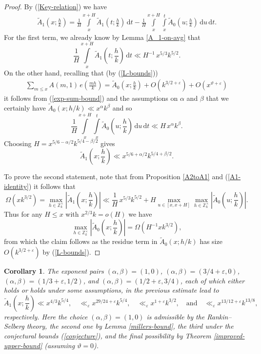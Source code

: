 \documentclass[a4paper,10pt,twoside]{amsart}
\newtheorem{corollary}[theorem]{Corollary}
\theoremstyle{definition}
\numberwithin{equation}{section}
\newcommand\eps{\varepsilon}
\renewcommand\:{\colon}
\begin{document}
\begin{proof}
By (\ref{Key-relation}) we have
\begin{align}\label{A1-identity}
\widetilde A_1\left(x;\frac hk\right)=\frac1H\int\limits_x^{x+H}\widetilde A_1\left(t;\frac hk\right)\,\mathrm dt
-\frac1H\int\limits_x^{x+H}\int\limits_x^t \widetilde A_0\left(u;\frac hk\right)\,\mathrm du\,\mathrm dt.
\end{align}
For the first term, we already know by Lemma \ref{A_1-on-avg} that
\[\frac1H\int\limits_x^{x+H}\widetilde A_1\left(t;\frac hk\right)\,\mathrm dt\ll H^{-1}\,x^{5/3}k^{5/2}.\]
On the other hand, recalling that (by (\ref{L-bounds}))
\begin{align}\label{Connecting_A_0_to_A}
\sum_{m\leqslant x}A(m,1)\,e\!\left(\frac{mh}k\right)=\widetilde A_0\!\left(x;\frac hk\right)+O(k^{3/2+\varepsilon})+O(x^{\vartheta+\varepsilon})
\end{align}
it follows from (\ref{exp-sum-bound}) and the assumptions on $\alpha$ and $\beta$ that we certainly have $\widetilde A_0(x;h/k)\ll x^\alpha k^\beta$ and so
\[\frac1H\int\limits_x^{x+H}\int\limits_x^t\widetilde A_0\left(u;\frac hk\right)\,\mathrm du\,\mathrm dt\ll H\,x^\alpha k^\beta.\]
Choosing $H=x^{5/6-\alpha/2}k^{5/4-\beta/2}$ gives
\[\widetilde A_1\left(x;\frac hk\right)\ll x^{5/6+\alpha/2}k^{5/4+\beta/2}.\]

\noindent To prove the second statement, note that from Proposition \ref{A2toA1} and (\ref{A1-identity}) it follows that
\[\Omega\left(xk^{3/2}\right)=\max_{h\in\mathbb Z_k^\times}\left|\widetilde A_1\left(x;\frac hk\right)\right|\ll \frac1H\,x^{5/3}k^{5/2}+H\max_{u\in[x,x+H]}\max_{h\in\mathbb Z_k^\times}\left|\widetilde A_0\left(u;\frac hk\right)\right|.\]
Thus for any $H\leq x$ with $x^{2/3}k=o(H)$ we have 
\[
\max_{h\in\mathbb Z_k^\times}\left|\widetilde A_0\left(x;\frac hk\right)\right|=\Omega\left(H^{-1}xk^{3/2}\right),\]
from which the claim follows as the residue term in $\widetilde A_0(x;h/k)$ has size $O(k^{3/2+\eps})$ by (\ref{L-bounds}).
\end{proof}

\begin{corollary}
The exponent pairs $(\alpha,\beta)=(1,0)$, $(\alpha,\beta)=(3/4+\varepsilon,0)$, $(\alpha,\beta)=(1/3+\varepsilon,1/2)$, and $(\alpha,\beta)=(1/2+\varepsilon,3/4)$, each of which either holds or holds under some assumptions, in the previous estimate lead to 
\[\widetilde A_1\left(x;\frac hk\right)\ll x^{4/3}k^{5/4},\quad
\ll_\eps x^{29/24+\varepsilon}k^{5/4},\quad
\ll_\eps x^{1+\varepsilon}k^{3/2},\quad\text{and}\quad
\ll_\eps x^{13/12+\varepsilon}k^{13/8},\]
respectively. Here the choice $(\alpha,\beta)=(1,0)$ is admissible by the Rankin--Selberg theory, the second one by Lemma \ref{millers-bound}, the third under the conjectural bounds (\ref{conjecture}), and the final possibility by Theorem \ref{improved-upper-bound} (assuming $\vartheta=0$).
\end{corollary}
    
\end{document}
